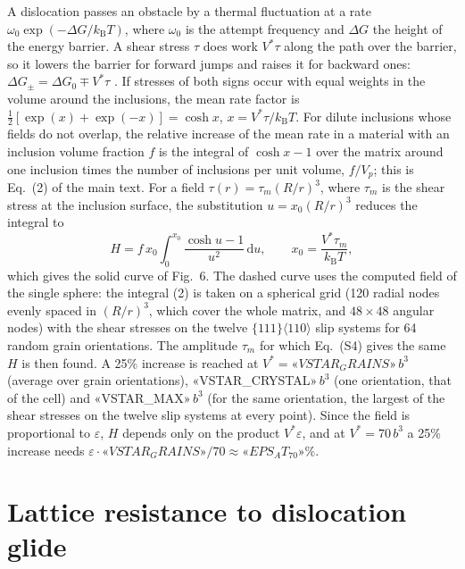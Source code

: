 \documentclass[11pt,a4paper]{article}
\begin{document}
A dislocation passes an obstacle by a thermal fluctuation at a rate
$\omega_0\exp(-\Delta G/k_{\mathrm B}T)$, where $\omega_0$ is the attempt frequency
and $\Delta G$ the height of the energy barrier. A shear stress $\tau$ does work $V^*\tau$
along the path over the barrier, so it lowers the barrier for forward jumps and
raises it for backward ones: $\Delta G_\pm=\Delta G_0\mp V^*\tau$
\cite{KocksArgonAshby1975,CaillardMartin2003}. If stresses of both signs occur
with equal weights in the volume around the inclusions, the mean rate factor is
$\tfrac12[\exp(x)+\exp(-x)]=\cosh x$, $x=V^*\tau/k_{\mathrm B}T$. For
dilute inclusions whose fields do not overlap, the relative increase
of the mean rate in a material with an inclusion volume fraction $f$ is the
integral of $\cosh x-1$ over the matrix around one inclusion times the number
of inclusions per unit volume, $f/V_p$; this is Eq.~(2) of the main text. For a
field $\tau(r)=\tau_m(R/r)^3$, where $\tau_m$ is the shear stress at the
inclusion surface, the substitution $u=x_0(R/r)^3$ reduces the
integral to
\begin{equation}
H=f\,x_0\int_0^{x_0}\frac{\cosh u-1}{u^2}\,\mathrm du,\qquad
x_0=\frac{V^*\tau_m}{k_{\mathrm B}T},
\end{equation}
which gives the solid curve of Fig.~6. The dashed curve uses the computed field
of the single sphere: the integral (2) is taken on a spherical grid (120 radial
nodes evenly spaced in $(R/r)^3$, which cover the whole matrix, and
$48\times48$ angular nodes) with the shear stresses on the
twelve $\{111\}\langle110\rangle$ slip systems for 64 random grain orientations.
The amplitude $\tau_m$ for which Eq.~(S4) gives the same $H$ is then found.
A 25\% increase is reached at $V^*=«VSTAR_GRAINS»\,b^3$ (average over grain
orientations), «VSTAR_CRYSTAL»$\,b^3$ (one orientation, that of the cell) and
«VSTAR_MAX»$\,b^3$ (for the same orientation, the largest of the shear stresses
on the twelve slip systems at every point). Since the field is proportional to
$\varepsilon$, $H$ depends only on the product $V^*\varepsilon$, and at
$V^*=70\,b^3$ a 25\% increase needs $\varepsilon\cdot«VSTAR_GRAINS»/70\approx
«EPS_AT_70»\%$.

\section{Lattice resistance to dislocation glide}
\end{document}
